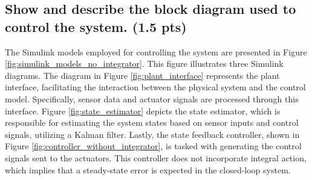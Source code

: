 \subsection{Show and describe the block diagram used to control the system. (1.5 pts)}
\vspace{10pt}



The Simulink models employed for controlling the system are presented in Figure \ref{fig:simulink_models_no_integrator}. This figure illustrates three Simulink diagrams. The diagram in Figure \ref{fig:plant_interface} represents the plant interface, facilitating the interaction between the physical system and the control model. Specifically, sensor data and actuator signals are processed through this interface. Figure \ref{fig:state_estimator} depicts the state estimator, which is responsible for estimating the system states based on sensor inputs and control signals, utilizing a Kalman filter. Lastly, the state feedback controller, shown in Figure \ref{fig:controller_without_integrator}, is tasked with generating the control signals sent to the actuators. This controller does not incorporate integral action, which implies that a steady-state error is expected in the closed-loop system.

